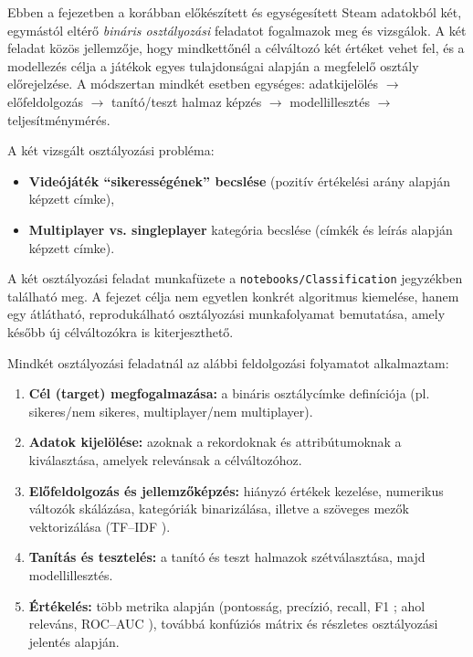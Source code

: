
Ebben a fejezetben a korábban előkészített és egységesített Steam \cite{steam} adatokból
két, egymástól eltérő \textit{bináris osztályozási} feladatot fogalmazok meg és
vizsgálok. A két feladat közös jellemzője, hogy mindkettőnél a célváltozó két értéket vehet fel,
és a modellezés célja a játékok egyes tulajdonságai alapján a megfelelő osztály előrejelzése.
A módszertan mindkét esetben egységes: adatkijelölés $\rightarrow$ előfeldolgozás $\rightarrow$
tanító/teszt halmaz képzés $\rightarrow$ modellillesztés $\rightarrow$ teljesítménymérés.

A két vizsgált osztályozási probléma:
\begin{itemize}
    \item \textbf{Videójáték ``sikerességének'' becslése} (pozitív értékelési arány alapján képzett címke),
    \item \textbf{Multiplayer vs. singleplayer} kategória becslése (címkék és leírás alapján képzett címke).
\end{itemize}

A két osztályozási feladat munkafüzete a \texttt{notebooks/Classification} jegyzékben található meg. A fejezet célja nem egyetlen konkrét algoritmus kiemelése,
hanem egy átlátható, reprodukálható osztályozási munkafolyamat bemutatása,
amely később új célváltozókra is kiterjeszthető.


Mindkét osztályozási feladatnál az alábbi feldolgozási folyamatot alkalmaztam:

\begin{enumerate}
    \item \textbf{Cél (target) megfogalmazása:}
    a bináris osztálycímke definíciója (pl. sikeres/nem sikeres, multiplayer/nem multiplayer).
    \item \textbf{Adatok kijelölése:}
    azoknak a rekordoknak és attribútumoknak a kiválasztása, amelyek relevánsak a célváltozóhoz.
    \item \textbf{Előfeldolgozás és jellemzőképzés:}
    hiányzó értékek kezelése, numerikus változók skálázása, kategóriák binarizálása,
    illetve a szöveges mezők vektorizálása (TF--IDF \cite{tf-idf}).
    \item \textbf{Tanítás és tesztelés:}
    a tanító és teszt halmazok szétválasztása, majd modellillesztés.
    \item \textbf{Értékelés:}
    több metrika alapján (pontosság, precízió, recall, F1 \cite{metrics}; ahol releváns, ROC--AUC \cite{roc-auc}),
    továbbá konfúziós mátrix \cite{metrics} és részletes osztályozási jelentés alapján.
\end{enumerate}

